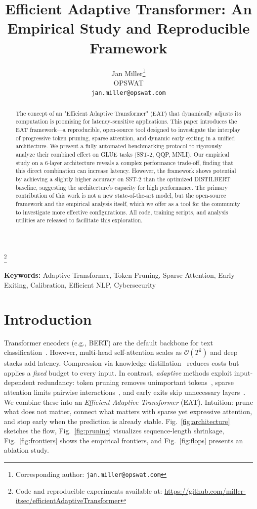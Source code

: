 \documentclass[11pt,letterpaper]{article}
\title{\textbf{Efficient Adaptive Transformer: An Empirical Study and Reproducible Framework}}
\author{
  Jan Miller\thanks{Corresponding author: \texttt{jan.miller@opswat.com}} \\
  \small OPSWAT \\
  \small \texttt{jan.miller@opswat.com}
}
\date{}
\theoremstyle{plain}
\newcommand{\eat}{\textsc{EAT}}
\newcommand{\bert}{\textsc{BERT}}
\begin{document}
\maketitle
\begingroup\def\thefootnote{}\footnote{Code and reproducible experiments available at: \url{https://github.com/miller-itsec/efficientAdaptiveTransformer}}\endgroup

\begin{abstract}
The concept of an "Efficient Adaptive Transformer" (EAT) that dynamically adjusts its computation is promising for latency-sensitive applications. This paper introduces the EAT framework---a reproducible, open-source tool designed to investigate the interplay of progressive token pruning, sparse attention, and dynamic early exiting in a unified architecture. We present a fully automated benchmarking protocol to rigorously analyze their combined effect on GLUE tasks (SST-2, QQP, MNLI). Our empirical study on a 6-layer architecture reveals a complex performance trade-off, finding that this direct combination can increase latency. However, the framework shows potential by achieving a slightly higher accuracy on SST-2 than the optimized DISTILBERT baseline, suggesting the architecture's capacity for high performance. The primary contribution of this work is not a new state-of-the-art model, but the open-source framework and the empirical analysis itself, which we offer as a tool for the community to investigate more effective configurations. All code, training scripts, and analysis utilities are released to facilitate this exploration.
\end{abstract}

\noindent\textbf{Keywords:} Adaptive Transformer, Token Pruning, Sparse Attention, Early Exiting, Calibration, Efficient NLP, Cybersecurity

\section{Introduction}
Transformer encoders (e.g., \bert{}) are the default backbone for text classification~\citep{devlin2019bert,vaswani2017attention}.
However, multi-head self-attention scales as $\mathcal{O}(T^2)$ and deep stacks add latency.
Compression via knowledge distillation~\citep{hinton2015distill,sanh2019distilbert,turc2019wellread} reduces costs but applies a \emph{fixed} budget to every input.
In contrast, \emph{adaptive} methods exploit input-dependent redundancy: token pruning removes unimportant tokens~\citep{goyal2020powerbert,kim2021learned}, sparse attention limits pairwise interactions~\citep{zaheer2020bigbird,beltagy2020longformer,wang2020linformer,choromanski2021performer,kitaev2020reformer}, and early exits skip unnecessary layers~\citep{xin2020deebert,zhou2020bert}.
We combine these into an \emph{Efficient Adaptive Transformer} (\eat{}). Intuition: prune what does not matter, connect what matters with sparse yet expressive attention, and stop early when the prediction is already stable.
Fig.~\ref{fig:architecture} sketches the flow, Fig.~\ref{fig:pruning} visualizes sequence-length shrinkage, Fig.~\ref{fig:frontiers} shows the empirical frontiers, and Fig.~\ref{fig:flops} presents an ablation study.
\end{document}
